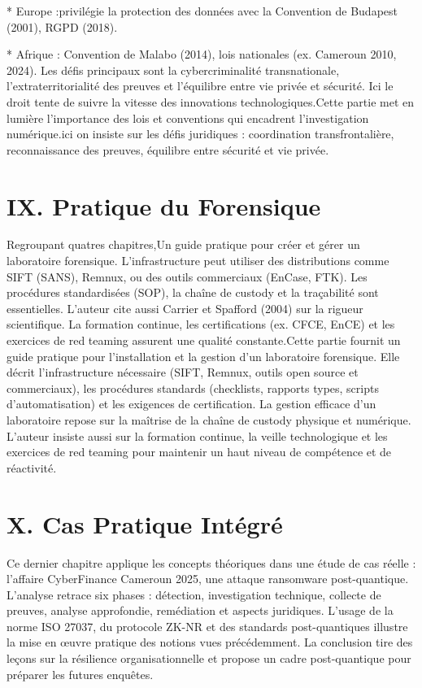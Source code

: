 \documentclass[12pt,a4paper]{article}
\begin{document}
	
	* Europe :privilégie la protection des données avec la Convention de Budapest (2001), RGPD (2018).
	
	* Afrique : Convention de Malabo (2014), lois nationales (ex. Cameroun 2010, 2024).
	Les défis principaux sont la cybercriminalité transnationale, l’extraterritorialité des preuves et l’équilibre entre vie privée et sécurité. Ici le droit tente de suivre la vitesse des innovations technologiques.Cette partie met en lumière l’importance des lois et conventions qui encadrent l’investigation numérique.ici on insiste sur les défis juridiques : coordination transfrontalière, reconnaissance des preuves, équilibre entre sécurité et vie privée.
	
	\section*{IX. Pratique du Forensique}
	Regroupant quatres chapitres,Un guide pratique pour créer et gérer un laboratoire forensique. L’infrastructure peut utiliser des distributions comme SIFT (SANS), Remnux, ou des outils commerciaux (EnCase, FTK). Les procédures standardisées (SOP), la chaîne de custody et la traçabilité sont essentielles. L’auteur cite aussi Carrier et Spafford (2004) sur la rigueur scientifique. La formation continue, les certifications (ex. CFCE, EnCE) et les exercices de red teaming assurent une qualité constante.Cette partie fournit un guide pratique pour l’installation et la gestion d’un laboratoire forensique. Elle décrit l’infrastructure nécessaire (SIFT, Remnux, outils open source et commerciaux), les procédures standards (checklists, rapports types, scripts d’automatisation) et les exigences de certification. La gestion efficace d’un laboratoire repose sur la maîtrise de la chaîne de custody physique et numérique. L’auteur insiste aussi sur la formation continue, la veille technologique et les exercices de red teaming pour maintenir un haut niveau de compétence et de réactivité.
	
	\section*{X. Cas Pratique Intégré}
	Ce dernier chapitre applique les concepts théoriques dans une étude de cas réelle : l’affaire CyberFinance Cameroun 2025, une attaque ransomware post-quantique. L’analyse retrace six phases : détection, investigation technique, collecte de preuves, analyse approfondie, remédiation et aspects juridiques. L’usage de la norme ISO 27037, du protocole ZK-NR et des standards post-quantiques illustre la mise en œuvre pratique des notions vues précédemment. La conclusion tire des leçons sur la résilience organisationnelle et propose un cadre post-quantique pour préparer les futures enquêtes.
	
\end{document}
